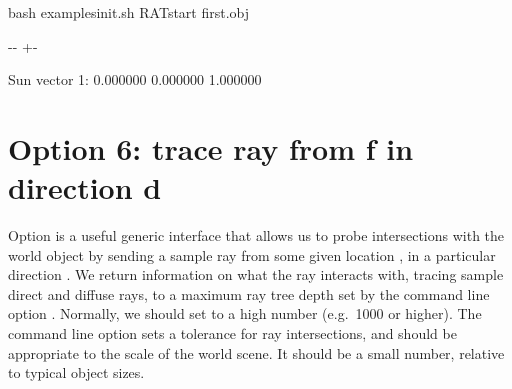 \documentclass[letterpaper,10pt,english]{sphinxmanual}
\newlength\nbsphinxcodecellspacing
\begin{document}
{
\begin{sphinxVerbatim}[commandchars=\\\{\}]
\llap{\color{nbsphinxin}[6]:\,\hspace{\fboxrule}\hspace{\fboxsep}}\PYGZpc{}\PYGZpc{}bash
 examples\PYGZus{}init.sh
RATstart first.obj 
\end{sphinxVerbatim}
}

{

\kern-\sphinxverbatimsmallskipamount\kern-\baselineskip
\kern+\FrameHeightAdjust\kern-\fboxrule
\vspace{\nbsphinxcodecellspacing}

\begin{sphinxVerbatim}[commandchars=\\\{\}]
Sun vector 1: 0.000000 0.000000 1.000000
\end{sphinxVerbatim}
}


\section{Option 6: trace ray from f in direction d}
\label{\detokenize{RATstartOptions:Option-6:-trace-ray-from-f-in-direction-d}}
\begin{sphinxVerbatim}[commandchars=\\\{\}]
              
\end{sphinxVerbatim}

Option  is a useful generic interface that allows us to probe intersections with the world object by sending a sample ray from some given location , in a particular direction . We return information on what the ray interacts with, tracing sample direct and diffuse rays, to a maximum ray tree depth set by the command line option . Normally, we should set  to a high number (e.g. 1000 or higher). The command line option
 sets a tolerance for ray intersections, and should be appropriate to the scale of the world scene. It should be a small number, relative to typical object sizes.
\end{document}

